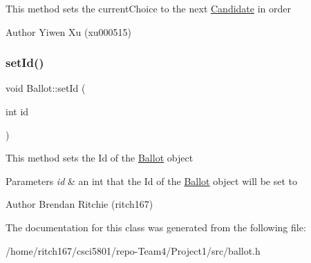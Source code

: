 This method sets the current\+Choice to the next \hyperlink{classCandidate}{Candidate} in order \begin{DoxyAuthor}{Author}
Yiwen Xu (xu000515) 
\end{DoxyAuthor}
\mbox{\label{classBallot_a1dbe98fb3fc76b2fc4f1a0ee40f3c808}} 
\subsubsection{\texorpdfstring{set\+Id()}{setId()}}
{\footnotesize\ttfamily void Ballot\+::set\+Id (\begin{DoxyParamCaption}\item[{int}]{id }\end{DoxyParamCaption})}

This method sets the Id of the \hyperlink{classBallot}{Ballot} object 
\begin{DoxyParams}{Parameters}
{\em id} & an int that the Id of the \hyperlink{classBallot}{Ballot} object will be set to \\
\hline
\end{DoxyParams}
\begin{DoxyAuthor}{Author}
Brendan Ritchie (ritch167) 
\end{DoxyAuthor}


The documentation for this class was generated from the following file\+:\begin{DoxyCompactItemize}
\item 
/home/ritch167/csci5801/repo-\/\+Team4/\+Project1/src/ballot.\+h\end{DoxyCompactItemize}
